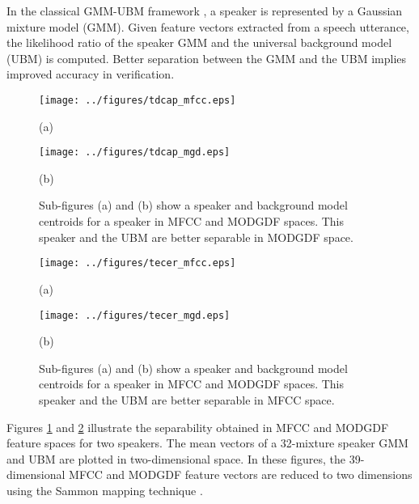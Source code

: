 \documentclass[preprint,12pt,5p]{elsarticle}
\begin{document}
In the classical GMM-UBM framework \cite{reynoldsAdaptedGMM}, a speaker is
represented by a Gaussian mixture model (GMM). Given feature vectors extracted
from a speech utterance, the likelihood ratio of the speaker GMM and the
universal background model (UBM) is computed. Better separation between the GMM
and the UBM implies improved accuracy in verification.

\begin{figure}[h]
\centering 
\begin{minipage}[c]{0.5\textwidth}
\centering 
    \texttt{[image: ../figures/tdcap\_mfcc.eps]}
	\caption*{(a)}
\end{minipage}

\begin{minipage}[c]{0.5\textwidth}
\centering  
\vspace{5mm}
    \texttt{[image: ../figures/tdcap\_mgd.eps]}
	\caption*{(b)}
\end{minipage}
\caption{Sub-figures (a) and (b) show a speaker and background model
centroids for a speaker in MFCC and MODGDF spaces. This speaker and the UBM are better
separable in MODGDF space.}
\label{fig:ubm_sep1}
\end{figure}

\begin{figure}[h]
\centering 
\begin{minipage}[c]{0.5\textwidth}
\centering 
    \texttt{[image: ../figures/tecer\_mfcc.eps]}
	\caption*{(a)}
\end{minipage}

\begin{minipage}[c]{0.5\textwidth}
\centering  
\vspace{5mm}
    \texttt{[image: ../figures/tecer\_mgd.eps]}
	\caption*{(b)}
\end{minipage}
\caption{Sub-figures (a) and (b) show a speaker and background model
centroids for a speaker in MFCC and MODGDF spaces. This speaker and the UBM are better
separable in MFCC space.}
\label{fig:ubm_sep2}
\end{figure}

Figures \ref{fig:ubm_sep1} and \ref{fig:ubm_sep2} illustrate the
separability obtained in MFCC and MODGDF feature spaces for two 
speakers. The mean vectors of a 32-mixture speaker GMM and UBM are plotted in
two-dimensional space. In these figures, the 39-dimensional MFCC and MODGDF
feature vectors are reduced to two dimensions using the Sammon mapping technique
\cite{sammon}. 
\end{document}
